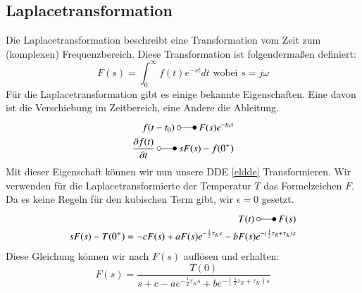 \subsection{Laplacetransformation}
Die Laplacetransformation beschreibt eine Transformation vom Zeit zum (komplexen) Frequenzbereich.
Diese Transformation ist folgendermaßen definiert:
\begin{equation}
	F(s)=\int_{0}^{\infty}f(t)e^{-st}dt \text{ wobei } s=j\omega
\end{equation} 
Für die Laplacetransformation gibt es einige bekannte Eigenschaften. 
Eine davon ist die Verschiebung im Zeitbereich, eine Andere die Ableitung.
\begin{align}
	f(t-t_0)\: \laplace \: F(s)e^{-t_0 s}\\
	\frac{\partial f(t)}{\partial t}\: \laplace \: sF(s)-f(0^+)
\end{align}
Mit dieser Eigenschaft können wir nun unsere DDE \ref{eldde} Transformieren.
Wir verwenden für die Laplacetransformierte der Temperatur $T$ das Formelzeichen $F$.
Da es keine Regeln für den kubischen Term gibt, wir $\epsilon = 0$ gesetzt.
\begin{align}
	T(t)\: \laplace \: F(s)\\
	sF(s)-T(0^+)=-cF(s)+aF(s)e^{-\frac{1}{2}\tau_K s}-bF(s)e^{-(\frac{1}{2}\tau_R + \tau_K) s}
\end{align}
Diese Gleichung können wir nach $F(s)$ auflösen und erhalten:
\begin{equation}
	F(s) = \frac{T(0)}{s+c-ae^{-\frac{1}{2}\tau_K s}+be^{-(\frac{1}{2}\tau_R + \tau_K)s}}
\end{equation}
